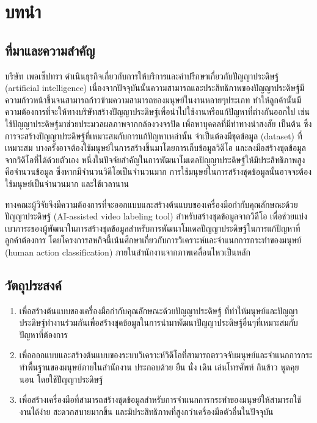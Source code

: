 \chapter{บทนำ}
\section{ที่มาและความสำคัญ}
บริษัท เพอเซ็ปทรา ดำเนินธุรกิจเกี่ยวกับการให้บริการและคำปรึกษาเกี่ยวกับปัญญาประดิษฐ์ (artificial intelligence)
เนื่องจากปัจจุบันนั้นความสามารถและประสิทธิภาพของปัญญาประดิษฐ์มีความก้าวหน้าขึ้นจนสามารถก้าวข้ามความสามารถของมนุษย์ในงานหลายๆประเภท
ทำให้ลูกค้านั้นมีความต้องการที่จะให้ทางบริษัทสร้างปัญญาประดิษฐ์เพื่อนำไปใช้งานหรือแก้ปัญหาที่ต่างกันออกไป เช่น ใช้ปัญญาประดิษฐ์มาช่วยประมวลผลภาพจากกล้องวงจรปิด เพื่อหาบุคคลที่มีท่าทางน่าสงสัย เป็นต้น
ซึ่งการจะสร้างปัญญาประดิษฐ์ที่เหมาะสมกับการแก้ปัญหาเหล่านั้น จำเป็นต้องมีชุดข้อมูล (dataset) ที่เหมาะสม บางครั้งอาจต้องใช้มนุษย์ในการสร้างขึ้นมาโดยการเก็บข้อมูลวิดีโอ 
และลงมือสร้างชุดข้อมูลจากวิดีโอที่ได้ด้วยตัวเอง หนึ่งในปัจจัยสำคัญในการพัฒนาโมเดลปัญญาประดิษฐ์ให้มีประสิทธิภาพสูงคือจำนวนข้อมูล
ซึ่งหากมีจำนวนวิดีโอเป็นจำนวนมาก การใช้มนุษย์ในการสร้างชุดข้อมูลนั้นอาจจะต้องใช้มนุษย์เป็นจำนวนมาก และใช้เวลานาน 

ทางคณะผู้วิจัยจึงมีความต้องการที่จะออกแบบและสร้างต้นแบบของเครื่องมือกำกับคุณลักษณะด้วยปัญญาประดิษฐ์ (AI-assisted video labeling tool) สำหรับสร้างชุดข้อมูลจากวิดีโอ 
เพื่อช่วยแบ่งเบาภาระของผู้พัฒนาในการสร้างชุดข้อมูลสำหรับการพัฒนาโมเดลปัญญาประดิษฐ์ในการแก้ปัญหาที่ลูกค้าต้องการ 
โดยโครงการสหกิจนี้เน้นศึกษาเกี่ยวกับการวิเคราะห์และจำแนกการกระทำของมนุษย์ (human action classification) ภายในสำนักงานจากภาพเคลื่อนไหวเป็นหลัก

\section{วัตถุประสงค์}
\begin{enumerate}
	\setlength\itemsep{-0.25em}
	\item เพื่อสร้างต้นแบบของเครื่องมือกำกับคุณลักษณะด้วยปัญญาประดิษฐ์ ที่ทำให้มนุษย์และปัญญาประดิษฐ์ทำงานร่วมกันเพื่อสร้างชุดข้อมูลในการนำมาพัฒนาปัญญาประดิษฐ์อื่นๆที่เหมาะสมกับปัญหาที่ต้องการ
	\item เพื่อออกแบบและสร้างต้นแบบของระบบวิเคราะห์วิดีโอที่สามารถตรวจจับมนุษย์และจำแนกการกระทำพื้นฐานของมนุษย์ภายในสำนักงาน ประกอบด้วย ยืน นั่ง เดิน เล่นโทรศัพท์ กินข้าว พูดคุย นอน โดยใช้ปัญญาประดิษฐ์
	\item เพื่อสร้างเครื่องมือที่สามารถสร้างชุดข้อมูลสำหรับการจำแนกการกระทำของมนุษย์ให้สามารถใช้งานได้ง่าย สะดวกสบายมากขึ้น และมีประสิทธิภาพที่สูงกว่าเครื่องมือตัวอื่นในปัจจุบัน
\end{enumerate}

